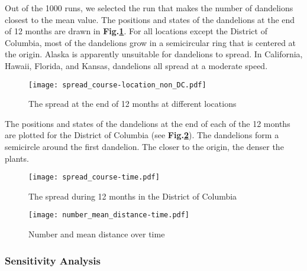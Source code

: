 \documentclass[12pt]{article}
\begin{document}
			Out of the 1000 runs, we selected the run that makes the number of dandelions closest to the mean value.  The positions and states of the dandelions at the end of 12 months are drawn in \textbf{Fig.\ref{fig:scatter5loc}}.  For all locations except the District of Columbia, most of the dandelions grow in a semicircular ring that is centered at the origin.  Alaska is apparently unsuitable for dandelions to spread.  In California, Hawaii, Florida, and Kansas, dandelions all spread at a moderate speed.
			
			\begin{figure}[htbp]
				\centering
				\texttt{[image: spread\_course-location\_non\_DC.pdf]}
				\caption{The spread at the end of 12 months at different locations}
				\label{fig:scatter5loc}
			\end{figure}
			
			The positions and states of the dandelions at the end of each of the 12 months are plotted for the District of Columbia (see \textbf{Fig.\ref{fig:spreadDC}}).  The dandelions form a semicircle around the first dandelion.  The closer to the origin, the denser the plants.
			
			\begin{figure}[htbp]
				\centering
				\texttt{[image: spread\_course-time.pdf]}
				\caption{The spread during 12 months in the District of Columbia}
				\label{fig:spreadDC}
			\end{figure}
					
			\begin{figure}[htbp]
				\centering
				\texttt{[image: number\_mean\_distance-time.pdf]}
				\caption{Number and mean distance over time}
				\label{fig:time}
			\end{figure}
		
		\subsubsection{Sensitivity Analysis}
		
\end{document}
